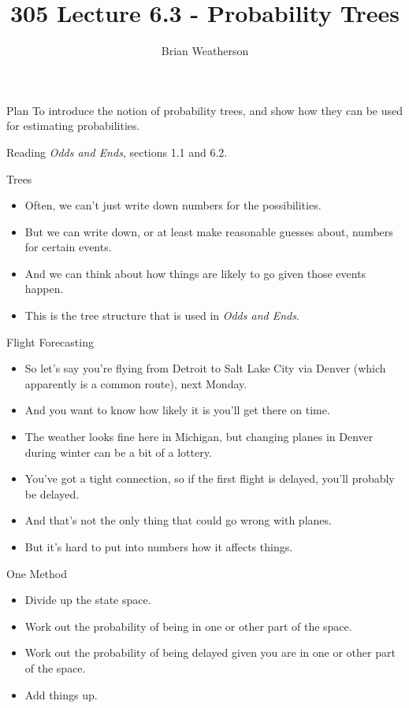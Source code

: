 \documentclass[
  ignorenonframetext,
]{beamer}
\title{305 Lecture 6.3 - Probability Trees}
\author{Brian Weatherson}
\date{}
\providecommand{\tightlist}{%
  \setlength{\itemsep}{0pt}\setlength{\parskip}{0pt}}
\renewcommand{\,}{\text{, }}
\begin{document}
\frame{\titlepage}

\begin{frame}{Plan}
\protect\hypertarget{plan}{}
To introduce the notion of probability trees, and show how they can be
used for estimating probabilities.
\end{frame}

\begin{frame}{Reading}
\protect\hypertarget{reading}{}
\emph{Odds and Ends}, sections 1.1 and 6.2.
\end{frame}

\begin{frame}{Trees}
\protect\hypertarget{trees}{}
\begin{itemize}
\tightlist
\item
  Often, we can't just write down numbers for the possibilities.
\item
  But we can write down, or at least make reasonable guesses about,
  numbers for certain events.
\item
  And we can think about how things are likely to go given those events
  happen.
\item
  This is the tree structure that is used in \emph{Odds and Ends}.
\end{itemize}
\end{frame}

\begin{frame}{Flight Forecasting}
\protect\hypertarget{flight-forecasting}{}
\begin{itemize}
\tightlist
\item
  So let's say you're flying from Detroit to Salt Lake City via Denver
  (which apparently is a common route), next Monday.
\item
  And you want to know how likely it is you'll get there on time.
\item
  The weather looks fine here in Michigan, but changing planes in Denver
  during winter can be a bit of a lottery.
\item
  You've got a tight connection, so if the first flight is delayed,
  you'll probably be delayed.
\item
  And that's not the only thing that could go wrong with planes.
\item
  But it's hard to put into numbers how it affects things.
\end{itemize}
\end{frame}

\begin{frame}{One Method}
\protect\hypertarget{one-method}{}
\begin{itemize}
\tightlist
\item
  Divide up the state space.
\item
  Work out the probability of being in one or other part of the space.
\item
  Work out the probability of being delayed given you are in one or
  other part of the space.
\item
  Add things up.
\end{itemize}
\end{frame}
\end{document}
